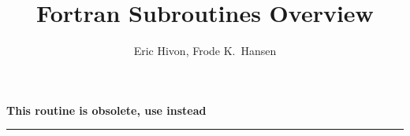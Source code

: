 
\sloppy


\title{\healpix Fortran Subroutines Overview}
 \section[read\_asctab*]{ }
\label{sub:read_asctab}
\author{Eric Hivon, Frode K.~Hansen}

\begin{facility}
{ {\bf This routine is obsolete, use  instead} }
{\modFitstools}
\end{facility}

\rule{\hsize}{2mm}

\newpage

